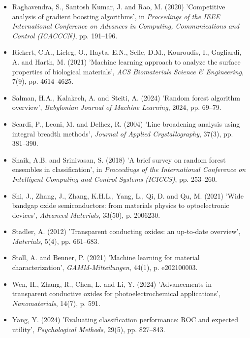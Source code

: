 \documentclass[12pt, oneside]{article} %
\begin{document}
\begin{itemize}[leftmargin=1.5em, label={}, itemsep=2mm]
\item Raghavendra, S., Santosh Kumar, J. and Rao, M. (2020) 'Competitive analysis of gradient boosting algorithms', in \textit{Proceedings of the IEEE International Conference on Advances in Computing, Communications and Control (ICACCCN)}, pp. 191--196.

\item Rickert, C.A., Lieleg, O., Hayta, E.N., Selle, D.M., Kouroudis, I., Gagliardi, A. and Harth, M. (2021) 'Machine learning approach to analyze the surface properties of biological materials', \textit{ACS Biomaterials Science \& Engineering}, 7(9), pp. 4614--4625.

\item Salman, H.A., Kalakech, A. and Steiti, A. (2024) 'Random forest algorithm overview', \textit{Babylonian Journal of Machine Learning}, 2024, pp. 69--79.

\item Scardi, P., Leoni, M. and Delhez, R. (2004) 'Line broadening analysis using integral breadth methods', \textit{Journal of Applied Crystallography}, 37(3), pp. 381--390.

\item Shaik, A.B. and Srinivasan, S. (2018) 'A brief survey on random forest ensembles in classification', in \textit{Proceedings of the International Conference on Intelligent Computing and Control Systems (ICICCS)}, pp. 253--260.

\item Shi, J., Zhang, J., Zhang, K.H.L., Yang, L., Qi, D. and Qu, M. (2021) 'Wide bandgap oxide semiconductors: from materials physics to optoelectronic devices', \textit{Advanced Materials}, 33(50), p. 2006230.

\item Stadler, A. (2012) 'Transparent conducting oxides: an up-to-date overview', \textit{Materials}, 5(4), pp. 661--683.

\item Stoll, A. and Benner, P. (2021) 'Machine learning for material characterization', \textit{GAMM-Mitteilungen}, 44(1), p. e202100003.

\item Wen, H., Zhang, R., Chen, L. and Li, Y. (2024) 'Advancements in transparent conductive oxides for photoelectrochemical applications', \textit{Nanomaterials}, 14(7), p. 591.

\item Yang, Y. (2024) 'Evaluating classification performance: ROC and expected utility', \textit{Psychological Methods}, 29(5), pp. 827--843.

\end{itemize}
\end{document}
